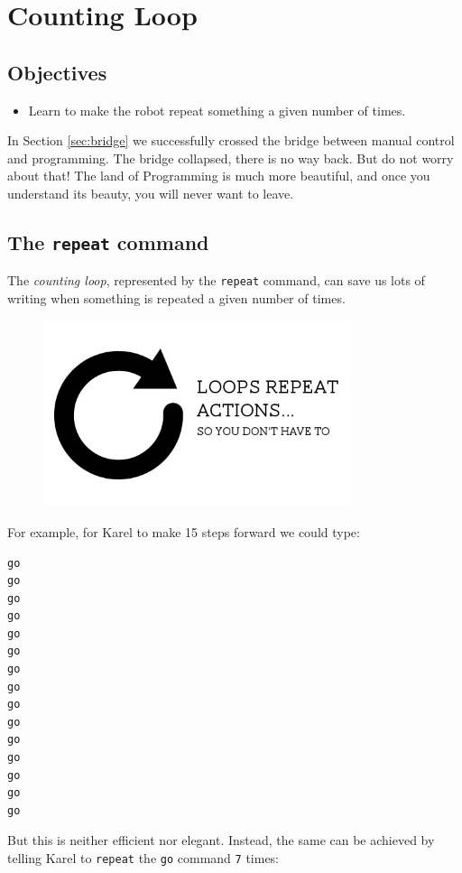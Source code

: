 
\section{Counting Loop} \label{sec:repeat}

\subsection{Objectives} 

\begin{itemize}
\item Learn to make the robot repeat something a given number of times.
\end{itemize}

\noindent
In Section \ref{sec:bridge} we successfully crossed the bridge between manual control 
and programming. The bridge collapsed, there is no way back. But do 
not worry about that! The land of Programming is much more beautiful,
and once you understand its beauty, you will never want to leave.


\subsection{The {\tt repeat} command}

The {\em counting loop}, represented by the {\tt repeat} command, can save 
us lots of writing when something is repeated a given number of times. 

\begin{figure}[!ht]
\begin{center}
\includegraphics[width=9cm]{imgk/a16.jpg}
\end{center}
\end{figure}
For example, for Karel to make 15 steps forward we could type:

\begin{verbatim}
go
go
go
go
go
go
go
go
go
go
go
go
go
go
go
\end{verbatim}
But this is neither efficient nor elegant. Instead, the same can be
achieved by telling Karel to {\tt repeat} the {\tt go} command {\tt 7} times:

